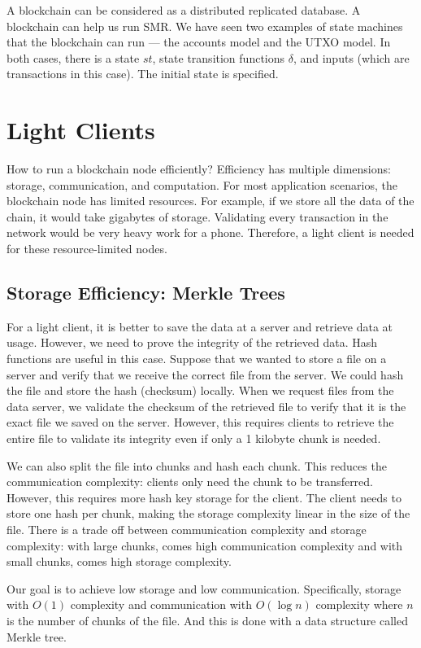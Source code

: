 A blockchain can be considered as a distributed replicated database. A blockchain can help us run SMR. We have seen two examples of state machines that the blockchain can run --- the accounts model and the UTXO model. In both cases, there is a state $st$, state transition functions $\delta$, and inputs (which are transactions in this case). The initial state is specified.

\section{Light Clients}

How to run a blockchain node efficiently? Efficiency has multiple dimensions: storage, communication, and computation. For most application scenarios, the blockchain node has limited resources. For example, if we store all the data of the chain, it would take gigabytes of storage. Validating every transaction in the network would be very heavy work for a phone. Therefore, a light client is needed for these resource-limited nodes.

\subsection{Storage Efficiency: Merkle Trees}

For a light client, it is better to save the data at a server and retrieve data at usage. However, we need to prove the integrity of the retrieved data. Hash functions are useful in this case. Suppose that we wanted to store a file on a server and verify that we receive the correct file from the server. We could hash the file and store the hash (checksum) locally. When we request files from the data server, we validate the checksum of the retrieved file to verify that it is the exact file we saved on the server. However, this requires clients to retrieve the entire file to validate its integrity even if only a 1 kilobyte chunk is needed.

We can also split the file into chunks and hash each chunk. This reduces the communication complexity: clients only need the chunk to be transferred. However, this requires more hash key storage for the client. The client needs to store one hash per chunk, making the storage complexity linear in the size of the file. There is a trade off between communication complexity and storage complexity: with large chunks, comes high communication complexity and with small chunks, comes high storage complexity.

Our goal is to achieve low storage and low communication. Specifically, storage with $O(1)$ complexity and communication with $O(\log n)$ complexity where $n$ is the number of chunks of the file. And this is done with a data structure called Merkle tree.

